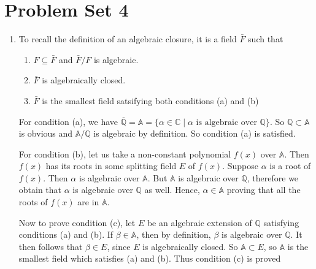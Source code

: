 \documentclass[12pt]{article}
\begin{document}
\section{Problem Set 4}
\begin{enumerate}
    \item[\bf{Soln 1 and 2: }] To recall the definition of an algebraic closure, it is a field $\bar F$ such that
    \begin{enumerate}
        \item $F \subseteq \bar F$ and $\bar F/F $ is algebraic.
        \item $\bar F$ is algebraically closed.
        \item $\bar F$ is the smallest field satsifying both conditions (a) and (b)
    \end{enumerate}

    For condition (a), we have  $\overline{\mathbb{Q}}={\mathbb{A}}=\{\alpha \in \mathbb{C} \mid  \text{$\alpha$ is algebraic over $\mathbb{Q}$}\}$. So $\mathbb{Q} \subset \mathbb{A}$ is obvious and $\mathbb{A/\mathbb{Q}}$ is algebraic by definition. So condition (a) is satisfied.


    For condition (b), let us take a non-constant polynomial $f(x)$ over $\mathbb{A}$. Then $f(x)$ has its roots in some splitting field $E$ of $f(x)$. Suppose $\alpha$ is a root of $f(x)$. Then $\alpha$ is algebraic over $\mathbb{A}$. But $\mathbb{A}$ is algebraic over $\mathbb{Q}$, therefore we obtain that $\alpha$ is algebraic over $\mathbb{Q}$ as well. Hence, $\alpha \in \mathbb{A}$ proving that all the roots of $f(x)$ are in $\mathbb{A}$.

    Now to prove condition (c), let $E$ be an algebraic extension of $\mathbb{Q}$ satisfying conditions (a) and (b). If $\beta \in \mathbb{A}$, then by definition, $\beta$ is algebraic over $\mathbb{Q}$. It then follows that $\beta \in E$, since $E$ is algebraically closed. So $\mathbb{A} \subset E$, so $\mathbb{A}$ is the smallest field which satisfies (a) and (b). Thus condition (c) is proved


\end{enumerate}
\end{document}
